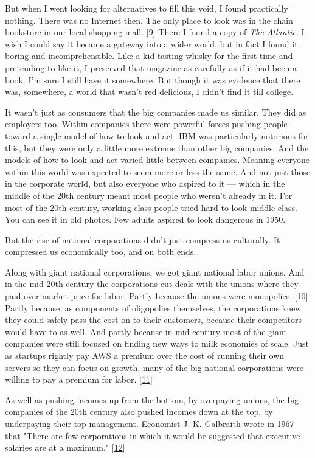But when I went looking for alternatives to fill this void, I found
practically nothing.  There was no Internet then.  The only place
to look was in the chain bookstore in our local shopping mall. 
[\href{\#f9n}{9}]
There I found a copy of \emph{The Atlantic}.  I wish I could say it became
a gateway into a wider world, but in fact I found it boring and
incomprehensible.  Like a kid tasting whisky for the first time and
pretending to like it, I preserved that magazine as carefully as
if it had been a book. I'm sure I still have it somewhere.  But
though it was evidence that there was, somewhere, a world that
wasn't red delicious, I didn't find it till college.

It wasn't just as consumers that the big companies made us similar.
They did as employers too.  Within companies there were powerful
forces pushing people toward a single model of how to look and act.
IBM was particularly notorious for this, but they were only a little
more extreme than other big companies.  And the models of how to
look and act varied little between companies. Meaning everyone
within this world was expected to seem more or less the same.  And
not just those in the corporate world, but also everyone who aspired
to it --- which in the middle of the 20th century meant most people
who weren't already in it.  For most of the 20th century, working-class
people tried hard to look middle class.  You can see it in old
photos.  Few adults aspired to look dangerous in 1950.

But the rise of national corporations didn't just compress us
culturally.  It compressed us economically too, and on both ends.

Along with giant national corporations, we got giant national labor
unions.  And in the mid 20th century the corporations cut deals
with the unions where they paid over market price for labor.  Partly
because the unions were monopolies. 
[\href{\#f10n}{10}]
Partly because, as
components of oligopolies themselves, the corporations knew they
could safely pass the cost on to their customers, because their
competitors would have to as well.  And partly because in mid-century
most of the giant companies were still focused on finding new ways
to milk economies of scale.  Just as startups rightly pay AWS a
premium over the cost of running their own servers so they can focus
on growth, many of the big national corporations were willing to
pay a premium for labor. 
[\href{\#f11n}{11}]

As well as pushing incomes up from the bottom, by overpaying unions,
the big companies of the 20th century also pushed incomes down at
the top, by underpaying their top management. Economist J. K.
Galbraith wrote in 1967 that "There are few corporations in which
it would be suggested that executive salaries are at a maximum."
[\href{\#f12n}{12}]

